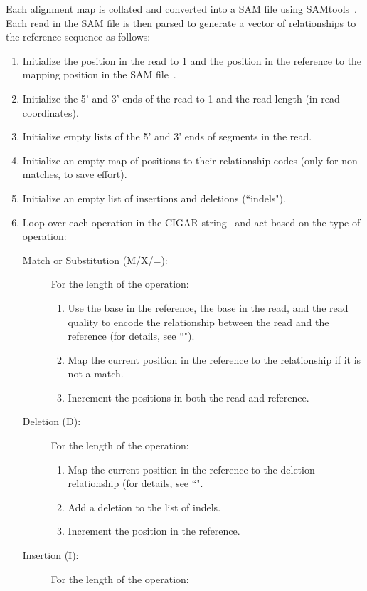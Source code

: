 \documentclass[11pt]{article}
\begin{document}
Each alignment map is collated and converted into a SAM file using SAMtools~\cite{Danecek2021}.
Each read in the SAM file is then parsed to generate a vector of relationships to the reference sequence as follows:
\begin{enumerate}
    \item Initialize the position in the read to 1 and the position in the reference to the mapping position in the SAM file~\cite{Li2009}.
    \item Initialize the 5' and 3' ends of the read to 1 and the read length (in read coordinates).
    \item Initialize empty lists of the 5' and 3' ends of segments in the read.
    \item Initialize an empty map of positions to their relationship codes (only for non-matches, to save effort).
    \item Initialize an empty list of insertions and deletions (``indels").
    \item Loop over each operation in the CIGAR string~\cite{Li2009} and act based on the type of operation:
    \begin{description}
        \item[Match or Substitution (M/X/=):] For the length of the operation:
        \begin{enumerate}
            \item Use the base in the reference, the base in the read, and the read quality to encode the relationship between the read and the reference (for details, see ``").
            \item Map the current position in the reference to the relationship if it is not a match.
            \item Increment the positions in both the read and reference.
        \end{enumerate}
        \item[Deletion (D):] For the length of the operation:
        \begin{enumerate}
            \item Map the current position in the reference to the deletion relationship (for details, see ``".
            \item Add a deletion to the list of indels.
            \item Increment the position in the reference.
        \end{enumerate}
        \item[Insertion (I):] For the length of the operation:

\end{description}
\end{enumerate}
\end{document}
